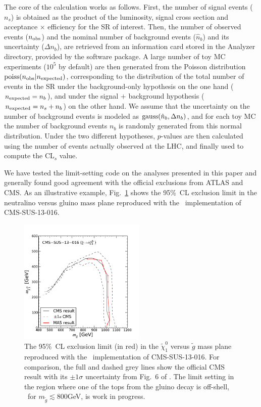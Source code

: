 The core of the calculation works as follows. First, the number of signal events ($n_s$) is obtained as the
product of the luminosity, signal cross section and acceptance $\times$ efficiency for the SR of interest.
Then, the number of observed events ($n_{\rm obs}$) and the nominal number of background
events ($\hat n_b$) and its uncertainty ($\Delta n_b$), are retrieved from an information card stored in the Analyzer directory, provided by the software package.
A large number of toy MC experiments ($10^5$ by default) are then generated from the Poisson distribution
${\rm poiss}(n_{\rm obs} | n_{\rm expected})$, 
corresponding to the distribution of the total number of events in the SR under the
background-only hypothesis on the one hand ($n_{\rm expected} = n_b$), and under the
signal $+$ background hypothesis ($n_{\rm expected} = n_s + n_b$) on the other hand.
We assume that the uncertainty on the number of background events is modeled as ${\rm gauss}(\hat n_b, \Delta n_b)$,
and for each toy MC the number of background events $n_b$ is randomly generated from this normal distribution.
Under the two different hypotheses, $p$-values are then calculated using the number of events actually observed at the LHC, and finally used to compute the CL$_s$ value.

We have tested the limit-setting code on the analyses presented in this paper and generally found good agreement with the official exclusions from ATLAS and CMS.
As an illustrative example, Fig.~\ref{fig:cms-016-limit} shows the 95\%~CL exclusion limit in the neutralino versus gluino mass plane reproduced with the \ma\ implementation \cite{MA5-CMS-SUS-13-016}  of CMS-SUS-13-016.  

\begin{figure}[!h]\centering
\includegraphics[width=6cm]{figures/madanalysis5/cms-016-limit.pdf}
\caption{The 95\%~CL exclusion limit (in red) in the $\tilde\chi^0_1$ versus $\tilde g$ mass plane reproduced 
with the \ma\ implementation  \cite{MA5-CMS-SUS-13-016}  of CMS-SUS-13-016. For comparison, the full and dashed grey lines show the official CMS result with its $\pm1\sigma$ uncertainty from Fig.~6 of \cite{CMS:2013ija}. 
The limit setting in the region where one of the tops from the gluino decay is off-shell, \ie\ for $m_{\tilde g}\lesssim 800$GeV, is work in progress.} 
\label{fig:cms-016-limit}
\end{figure}


